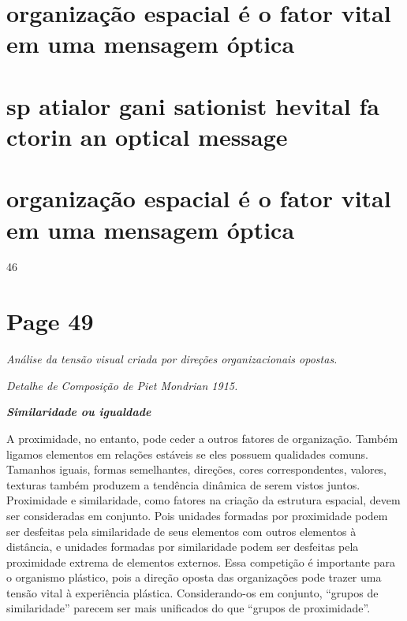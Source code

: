 \documentclass[a4paper]{article}
\begin{document}
\section*{organização espacial é o fator vital em uma mensagem óptica}

\section*{sp atialor gani sationist hevital fa ctorin an optical message}

\section*{organização espacial é o fator vital em uma mensagem óptica}

46

\newpage
\section*{Page 49}

\footnotesize
\textit{Análise da tensão visual criada por direções organizacionais opostas.}

\vspace{1em}

\textit{Detalhe de Composição de Piet Mondrian 1915.}
\normalsize

\vspace{2em}

\raggedright

\textbf{\textit{Similaridade ou igualdade}}

\vspace{1em}

A proximidade, no entanto, pode ceder a outros fatores de organização. Também ligamos elementos em relações estáveis se eles possuem qualidades comuns. Tamanhos iguais, formas semelhantes, direções, cores correspondentes, valores, texturas também produzem a tendência dinâmica de serem vistos juntos. Proximidade e similaridade, como fatores na criação da estrutura espacial, devem ser consideradas em conjunto. Pois unidades formadas por proximidade podem ser desfeitas pela similaridade de seus elementos com outros elementos à distância, e unidades formadas por similaridade podem ser desfeitas pela proximidade extrema de elementos externos. Essa competição é importante para o organismo plástico, pois a direção oposta das organizações pode trazer uma tensão vital à experiência plástica. Considerando-os em conjunto, ``grupos de similaridade'' parecem ser mais unificados do que ``grupos de proximidade''.
\end{document}
